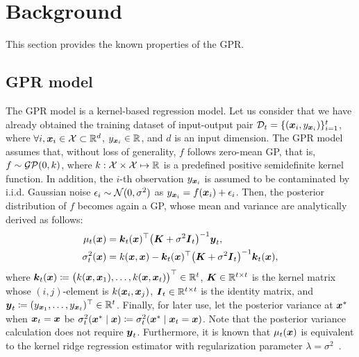 \section{Background}
\label{sec:background}

This section provides the known properties of the GPR.


\subsection{GPR model}

The GPR model \citep{Rasmussen2005-Gaussian} is a kernel-based regression model.
%
Let us consider that we have already obtained the training dataset of input-output pair ${\cal D}_t = \{ (\boldsymbol{x}_i, y_{\boldsymbol{x}_i}) \}_{i=1}^t$, where $\forall i, \boldsymbol{x}_i \in {\cal X} \subset \mathbb{R}^d$, $y_{\boldsymbol{x}_i} \in \mathbb{R}$, and $d$ is an input dimension.
%
The GPR model assumes that, without loss of generality, $f$ follows zero-mean GP, that is, $f \sim {\cal G} {\cal P} (0, k)$, where $k: {\cal X} \times {\cal X} \mapsto \mathbb{R}$ is a predefined positive semidefinite kernel function.
%
In addition, the $i$-th observation $y_{\boldsymbol{x}_i}$ is assumed to be contaminated by i.i.d. Gaussian noise $\epsilon_i \sim {\cal N}(0, \sigma^2)$ as $y_{\boldsymbol{x}_i} = f(\boldsymbol{x}_i) + \epsilon_i$.
%
Then, the posterior distribution of $f$ becomes again a GP, whose mean and variance are analytically derived as follows:
\begin{equation}
    \begin{split}
        \mu_{t}(\boldsymbol{x}) &= \boldsymbol{k}_{t}(\boldsymbol{x})^\top \bigl(\boldsymbol{K} + \sigma^2 \boldsymbol{I}_{t} \bigr)^{-1} \boldsymbol{y}_{t}, \\
        \sigma_{t}^2 (\boldsymbol{x}) &= k(\boldsymbol{x}, \boldsymbol{x}) - \boldsymbol{k}_{t}(\boldsymbol{x}) ^\top \bigl(\boldsymbol{K} + \sigma^2 \boldsymbol{I}_{t} \bigr)^{-1} \boldsymbol{k}_{t}(\boldsymbol{x}),
    \end{split}
    \label{eq:GP}
\end{equation}
where $\boldsymbol{k}_{t}(\boldsymbol{x}) \coloneqq \bigl( k(\boldsymbol{x}, \boldsymbol{x}_1), \dots, k(\boldsymbol{x}, \boldsymbol{x}_{t}) \bigr)^\top \in \mathbb{R}^{t}$, $\boldsymbol{K} \in \mathbb{R}^{t \times t}$ is the kernel matrix whose $(i, j)$-element is $k(\boldsymbol{x}_i, \boldsymbol{x}_j)$, $\boldsymbol{I}_{t} \in \mathbb{R}^{t \times t}$ is the identity matrix, and $\boldsymbol{y}_{t} \coloneqq (y_{\boldsymbol{x}_1}, \dots, y_{\boldsymbol{x}_t})^\top \in \mathbb{R}^{t}$.
%
Finally, for later use, let the posterior variance at $\boldsymbol{x}^*$ when $\boldsymbol{x}_t = \boldsymbol{x}$ be $\sigma_{t}^2 (\boldsymbol{x}^* \mid \boldsymbol{x}) \coloneqq \sigma_{t}^2 (\boldsymbol{x}^* \mid \boldsymbol{x}_t = \boldsymbol{x})$.
%
Note that the posterior variance calculation does not require $\boldsymbol{y}_t$.
%
Furthermore, it is known that $\mu_t(\boldsymbol{x})$ is equivalent to the kernel ridge regression estimator with regularization parameter $\lambda = \sigma^2$~\citep{kanagawa2018gaussian}.




